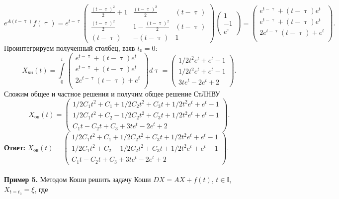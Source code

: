 \documentclass[a4paper, 12pt]{article}
\newcommand{\I}{\mathbb{I}}
\begin{document}
$$e^{A(t-\uptau)}f(\uptau) =e^{t-\uptau}
	\begin{pmatrix}
		\frac{(t-\uptau)^2}{2} + 1 & \frac{(t-\uptau)^2}{2} & (t-\uptau)\\
		\frac{(t-\uptau)^2}{2} & 1 - \frac{(t-\uptau)^2}{2} & (t-\uptau)\\
		(t-\uptau) & -(t-\uptau) & 1
	\end{pmatrix}\begin{pmatrix}
	1\\-1\\e^{\uptau}
\end{pmatrix} = \begin{pmatrix}
e^{t-\uptau} + (t-\uptau)e^t\\
e^{t-\uptau} + (t-\uptau)e^t\\
2e^{t-\uptau}(t-\uptau) + e^{t}\\
\end{pmatrix}.$$
Проинтегрируем полученный столбец, взяв $t_0 = 0$:
$$X_{\text{чн}}(t) = \int\limits_{0}^{t} \begin{pmatrix}
	e^{t-\uptau} + (t-\uptau)e^t\\
	e^{t-\uptau} + (t-\uptau)e^t\\
	2e^{t-\uptau}(t-\uptau) + e^{t}\\
\end{pmatrix} d\uptau = \begin{pmatrix}
1/2t^2e^t + e^t - 1\\
1/2t^2e^t + e^t - 1\\
3te^t - 2e^t + 2
\end{pmatrix}.$$
Сложим общее и частное решения и получим общее решение СтЛНВУ
$$X_{\text{oн}}(t) = \begin{pmatrix}
	1/2C_1t^2 + C_1 + 1/2C_2t^2 + C_3t + 1/2t^2e^t + e^t - 1\\
	1/2C_1t^2 + C_2 - 1/2C_2t^2 + C_3t + 1/2t^2e^t + e^t - 1\\
	C_1t - C_2t + C_3 + 3te^t - 2e^t + 2
\end{pmatrix}.$$
\textbf{Ответ:} $X_{\text{oн}}(t) = \begin{pmatrix}
	1/2C_1t^2 + C_1 + 1/2C_2t^2 + C_3t + 1/2t^2e^t + e^t - 1\\
	1/2C_1t^2 + C_2 - 1/2C_2t^2 + C_3t + 1/2t^2e^t + e^t - 1\\
	C_1t - C_2t + C_3 + 3te^t - 2e^t + 2
\end{pmatrix}.$\\\\
\textbf{Пример 5.} Методом Коши решить задачу Коши $DX = AX + f(t)$, $t \in \I$, $X_{t=t_0} = \xi$, где
\end{document}

